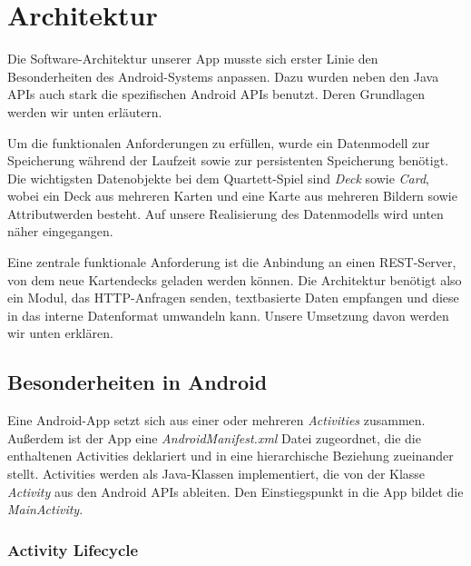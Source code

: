 \chapter{Architektur}
\label{cha:architektur}

Die Software-Architektur unserer App musste sich erster Linie den Besonderheiten des Android-Systems anpassen. Dazu wurden neben den Java APIs auch stark die spezifischen Android APIs benutzt. Deren Grundlagen werden wir unten erläutern.

Um die funktionalen Anforderungen zu erfüllen, wurde ein Datenmodell zur Speicherung während der Laufzeit sowie zur persistenten Speicherung benötigt. Die wichtigsten Datenobjekte bei dem Quartett-Spiel sind \emph{Deck} sowie \emph{Card}, wobei ein Deck aus mehreren Karten und eine Karte aus mehreren Bildern sowie Attributwerden besteht. Auf unsere Realisierung des Datenmodells wird unten näher eingegangen.

Eine zentrale funktionale Anforderung ist die Anbindung an einen REST-Server, von dem neue Kartendecks geladen werden können. Die Architektur benötigt also ein Modul, das HTTP-Anfragen senden, textbasierte Daten empfangen und diese in das interne Datenformat umwandeln kann. Unsere Umsetzung davon werden wir unten erklären.

\section{Besonderheiten in Android}
\label{sec:besonderheiten_android}

Eine Android-App setzt sich aus einer oder mehreren \emph{Activities} zusammen. Außerdem ist der App eine \emph{AndroidManifest.xml} Datei zugeordnet, die die enthaltenen Activities deklariert und in eine hierarchische Beziehung zueinander stellt. Activities werden als Java-Klassen implementiert, die von der Klasse \emph{Activity} aus den Android APIs ableiten. Den Einstiegspunkt in die App bildet die \emph{MainActivity}.

\subsection{Activity Lifecycle}

